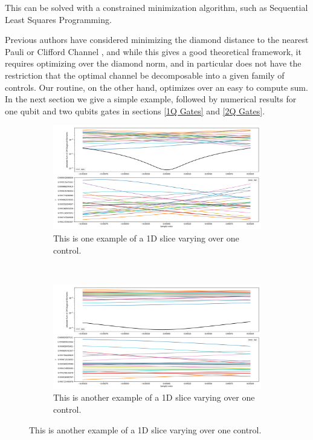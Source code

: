 \documentclass[aps,nofootinbib,pra,notitlepage,twocolumn]{revtex4-1}
\begin{document}
This can be solved with a constrained minimization algorithm, such as Sequential Least Squares Programming\cite{wright1999numerical}.

Previous authors have considered minimizing the diamond distance to the nearest Pauli or Clifford Channel \cite{Magesan2013}, and while this gives a good theoretical framework, it requires optimizing over the diamond norm, and in particular does not have the restriction that the optimal channel be decomposable into a given family of controls. Our routine, on the other hand, optimizes over an easy to compute sum. In the next section we give a simple example, followed by numerical results for one qubit and two qubits gates in sections \ref{1Q Gates} and \ref{2Q Gates}.


\begin{figure}
\centering
\begin{subfigure}[t]{.5\linewidth}
\includegraphics[width=\textwidth]{1q0.png}
\caption{This is one example of a 1D slice varying over one control.}
\end{subfigure}%
~
\begin{subfigure}[t]{.5\linewidth}
\includegraphics[width=\textwidth]{1q1.png}
\caption{This is another example of a 1D slice varying over one control.}
\end{subfigure}
  \label{fig:1qnum}
\end{figure}
\end{document}
